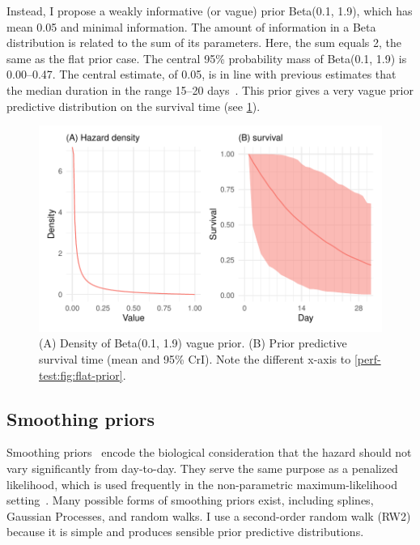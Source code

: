 \documentclass[thesis.tex]{subfiles}
\begin{document}
Instead, I propose a weakly informative (or vague) prior Beta(0.1, 1.9), which has mean 0.05 and minimal information.
The amount of information in a Beta distribution is related to the sum of its parameters.
Here, the sum equals 2, the same as the flat prior case.
The central 95\% probability mass of Beta(0.1, 1.9) is 0.00--0.47.
The central estimate, of 0.05, is in line with previous estimates that the median duration in the range 15--20 days~\autocite{cevikShedding}.
This prior gives a very vague prior predictive distribution on the survival time (see \cref{perf-test:fig:vague-prior}).
\begin{figure}
  \centering \includegraphics{cis-perfect-testing/vague-prior}
  \caption[Vague prior for the hazard]{
    (A) Density of Beta(0.1, 1.9) vague prior.
    (B) Prior predictive survival time (mean and 95\% CrI).
    Note the different x-axis to \cref{perf-test:fig:flat-prior}.
  }
  \label{perf-test:fig:vague-prior}
\end{figure}


\subsection{Smoothing priors}

Smoothing priors~\autocite{gerschSmoothness} encode the biological consideration that the hazard should not vary significantly from day-to-day.
They serve the same purpose as a penalized likelihood, which is used frequently in the non-parametric maximum-likelihood setting~\autocite[e.g.][]{bacchettiNonparametric}.
Many possible forms of smoothing priors exist, including splines, Gaussian Processes, and random walks.
I use a second-order random walk (RW2) because it is simple and produces sensible prior predictive distributions.
\end{document}
